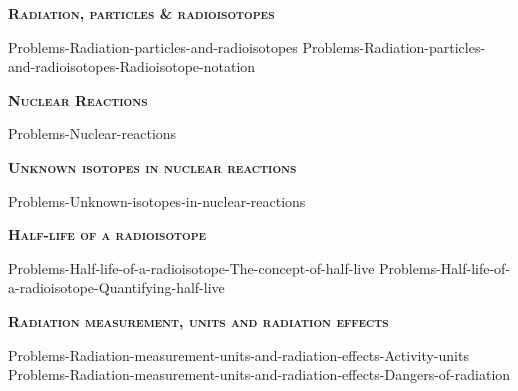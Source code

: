 \documentclass[main.tex]{subfiles}
\newcommand\chapterlabel{Ch-nuclear}
\begin{document}
\newpage
 
\fancyhfoffset[E,O]{0pt}
\setlength{\columnsep}{30pt}
\begin{conclusion}
\end{conclusion}
\begin{multicols*}{2}\setcounter{numA}{1}







{\raggedright\textsc{\textbf{Radiation, particles \& radioisotopes }}\par}

{Problems-Radiation-particles-and-radioisotopes}
{Problems-Radiation-particles-and-radioisotopes-Radioisotope-notation}







{\raggedright\textsc{\textbf{Nuclear Reactions }}\par}

{Problems-Nuclear-reactions}

  

 {\raggedright\textsc{\textbf{Unknown isotopes in nuclear reactions }}\par}



{Problems-Unknown-isotopes-in-nuclear-reactions}





{\raggedright\textsc{\textbf{Half-life of a radioisotope }}\par}
{Problems-Half-life-of-a-radioisotope-The-concept-of-half-live}
{Problems-Half-life-of-a-radioisotope-Quantifying-half-live}

 
{\raggedright\textsc{\textbf{ Radiation measurement, units and radiation effects }}\par}

{Problems-Radiation-measurement-units-and-radiation-effects-Activity-units}
{Problems-Radiation-measurement-units-and-radiation-effects-Dangers-of-radiation}





\end{multicols*} \checkoddpage\ifoddpage \clearpage\thispagestyle{empty}\mbox{}\clearpage \else  \fi
\end{document}
